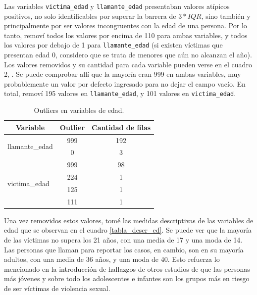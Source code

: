 \documentclass[10 pt]{article}
\begin{document}
Las variables \texttt{victima\_edad} y \texttt{llamante\_edad} presentaban valores atípicos positivos, no solo identificables por superar la barrera de \(3*IQR\), sino también y principalmente por ser valores incongruentes con la edad de una persona. Por lo tanto, removí todos los valores por encima de 110 para ambas variables, y todos los valores por debajo de 1 para \texttt{llamante\_edad} (si existen víctimas que presentan edad 0, considero que se trata de menores que aún no alcanzan el año). Los valores removidos y su cantidad para cada variable pueden verse en el cuadro 2, . Se puede comprobar allí que la mayoría eran 999 en ambas variables, muy probablemente un valor por defecto ingresado para no dejar el campo vacío. En total, removí 195 valores en \texttt{llamante\_edad}, y 101 valores en \texttt{victima\_edad}. 



\begin{table}[H]
    \centering
    \small
    \caption{Outliers en variables de edad.}
    \label{tabla_out}
    \begin{tabular}{lcc}
    \hline
    \multicolumn{1}{c}{\textbf{Variable}} & \textbf{Outlier} & \textbf{Cantidad de filas} \\ \hline
    \multirow{2}{*}{llamante\_edad}       & 999              & 192                        \\
                                          & 0                & 3                          \\ \hline
    \multirow{4}{*}{victima\_edad}        & 999              & 98                         \\
                                          & 224              & 1                          \\
                                          & 125              & 1                          \\
                                          & 111              & 1                          \\ \hline
    \end{tabular}
    \end{table}


Una vez removidos estos valores, tomé las medidas descriptivas de las variables de edad que se observan en el cuadro \ref{tabla_descr_ed}. Se puede ver que la mayoría de las víctimas no supera los 21 años, con una media de 17 y una moda de 14. Las personas que llaman para reportar los casos, en cambio, son en su mayoría adultos, con una media de 36 años, y una moda de 40. Esto refuerza lo mencionado en la introducción de hallazgos de otros estudios de que las personas más jóvenes y sobre todo los adolescentes e infantes son los grupos más en riesgo de ser víctimas de violencia sexual. 
\end{document}
